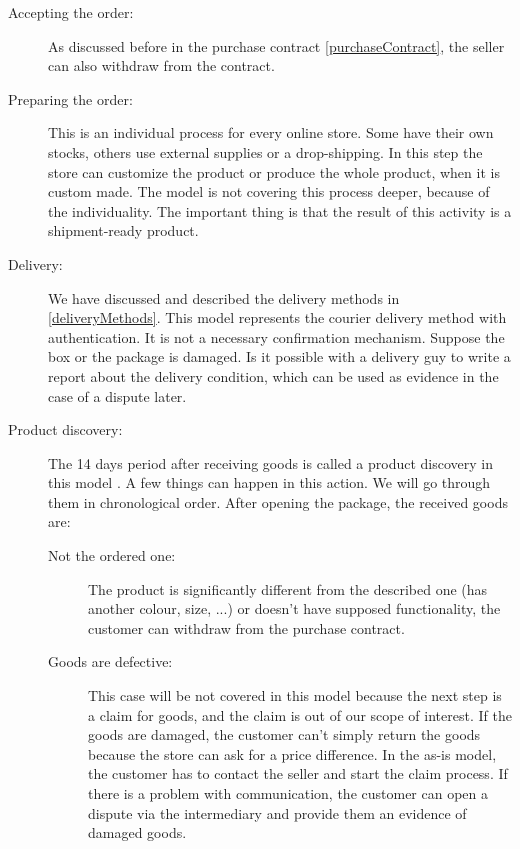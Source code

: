 \documentclass[thesis=M,english]{FITthesis}[2019/12/23]
\begin{document}
\begin{description}
\item[Accepting the order:]
As discussed before in the purchase contract \ref{purchaseContract}, the seller can also withdraw from the contract.

\item[Preparing the order:]
This is an individual process for every online store. Some have their own stocks, others use external supplies or a drop-shipping. 
In this step the store can customize the product or produce the whole product, when it is custom made. The model is not covering this process deeper, because of the individuality. The important thing is that the result of this activity is a shipment-ready product.

\item[Delivery:]
We have discussed and described the delivery methods in \ref{deliveryMethods}. This model represents the courier delivery method with authentication. It is not a necessary confirmation mechanism.
Suppose the box or the package is damaged. Is it possible with a delivery guy to write a report about the delivery condition, which can be used as evidence in the case of a dispute later. 

\item[Product discovery:]

The 14 days period after receiving goods is called a product discovery in this model . A few things can happen in this action. We will go through them in chronological order.
After opening the package, the received goods are:
\begin{description}

\item[Not the ordered one:] The product is significantly different from the described one (has another colour, size, ...) or doesn't have supposed functionality, the customer can withdraw from the purchase contract. 

\item[Goods are defective:] This case will be not covered in this model because the next step is a claim for goods, and the claim is out of our scope of interest. If the goods are damaged, the customer can't simply return the goods because the store can ask for a price difference. 
In the as-is model, the customer has to contact the seller and start the claim process. If there is a problem with communication, the customer can open a dispute via the intermediary and provide them an evidence of damaged goods. 
\end{description}


\end{description}
\end{document}
